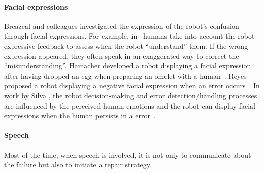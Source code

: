 \documentclass[a4paper,11pt,twoside]{StyleThese}
\begin{document}
\paragraph{Facial expressions} Breazeal and colleagues investigated the expression of the robot's confusion through facial expressions. For example, in~\cite{breazeal_2002_regulation, breazeal_2003_emotion} humans take into account the robot expressive feedback to assess when the robot ``understand'' them. If the wrong expression appeared, they often speak in an exaggerated way to correct the ``misunderstanding''. Hamacher \etal{} developed a robot  displaying a facial expression after having dropped an egg when preparing an omelet with a human~\cite {hamacher_2016_believing}. Reyes \etal{} proposed a robot displaying a negative facial expression when an error occurs~\cite{reyes_2015_positive}. In work by Silva \etal, the robot decision-making and error detection/handling processes are influenced by the perceived human emotions and the robot can display facial expressions when the human persists in a error~\cite{silva_2016_combining}.

\paragraph{Speech} Most of the time, when speech is involved, it is not only to communicate about the failure but also to initiate a repair strategy. 
\end{document}
